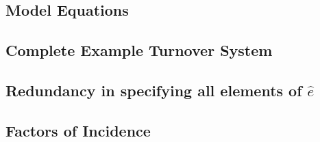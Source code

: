 
\subsection{Model Equations}\label{aa:eqs-model}

\subsection{Complete Example Turnover System}\label{aa:eqs-turnover}

\subsection{Redundancy in specifying all elements of $\hat{e}$}\label{aa:eqs-e-redundant}

\subsection{Factors of Incidence}\label{aa:eqs-incidence}

